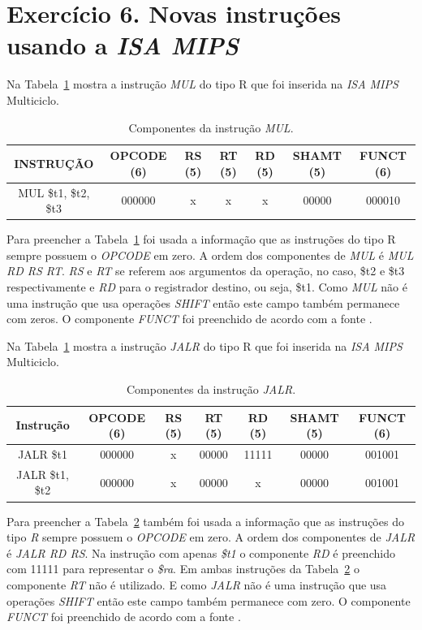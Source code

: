\documentclass[12pt]{article}
\begin{document}
  
\section{Exercício 6. Novas instruções usando a \textit{ISA MIPS}}
\label{sec:isamips}

Na Tabela~\ref{tab:mul} mostra a instrução \textit{MUL} do tipo R que foi inserida na \textit{ISA MIPS} Multiciclo.

\begin{table}[H]
	\centering
	\begin{tabular}{|c|c|c|c|c|c|c|}
		\hline
		INSTRUÇÃO & OPCODE (6) & RS (5) & RT (5) & RD (5) & SHAMT (5) & FUNCT (6) \\\hline
		MUL \$t1, \$t2, \$t3 & 000000 & x & x & x & 00000 & 000010 \\\hline
	\end{tabular}
	\caption{Componentes da instrução \textit{MUL}.}
	\label{tab:mul}
\end{table}

Para preencher a Tabela~\ref{tab:mul} foi usada a informação que as instruções do tipo R sempre possuem o \textit{OPCODE} em zero. A ordem dos componentes de \textit{MUL} é \textit{MUL RD RS RT}. \textit{RS} e \textit{RT} se referem aos argumentos da operação, no caso, \$t2 e \$t3 respectivamente e \textit{RD} para o registrador destino, ou seja, \$t1. Como \textit{MUL} não é uma instrução que usa operações \textit{SHIFT} então este campo também permanece com zeros. O componente \textit{FUNCT} foi preenchido de acordo com a fonte \cite{mips32}.

Na Tabela~\ref{tab:mul} mostra a instrução \textit{JALR} do tipo R que foi inserida na \textit{ISA MIPS} Multiciclo.

\begin{table}[H]
	\centering
	\begin{tabular}{|c|c|c|c|c|c|c|}
		\hline
		Instrução & OPCODE (6) & RS (5) & RT (5) & RD (5) & SHAMT (5) & FUNCT (6) \\\hline
		JALR \$t1 & 000000 & x & 00000 & 11111 & 00000 & 001001 \\\hline
		JALR \$t1, \$t2 & 000000 & x & 00000 & x & 00000 & 001001 \\\hline
	\end{tabular}
	\caption{Componentes da instrução \textit{JALR}.}
	\label{tab:jalr}
\end{table}

Para preencher a Tabela~\ref{tab:jalr} também foi usada a informação que as instruções do tipo \textit{R} sempre possuem o \textit{OPCODE} em zero. A ordem dos componentes de \textit{JALR} é \textit{JALR RD RS}. Na instrução com apenas \textit{\$t1} o componente \textit{RD} é preenchido com 11111 para representar o \textit{\$ra}. Em ambas instruções da Tabela~\ref{tab:jalr} o componente \textit{RT} não é utilizado. E como \textit{JALR} não é uma instrução que usa operações \textit{SHIFT} então este campo também permanece com zero. O componente \textit{FUNCT} foi preenchido de acordo com a fonte \cite{mips32}.
\end{document}
